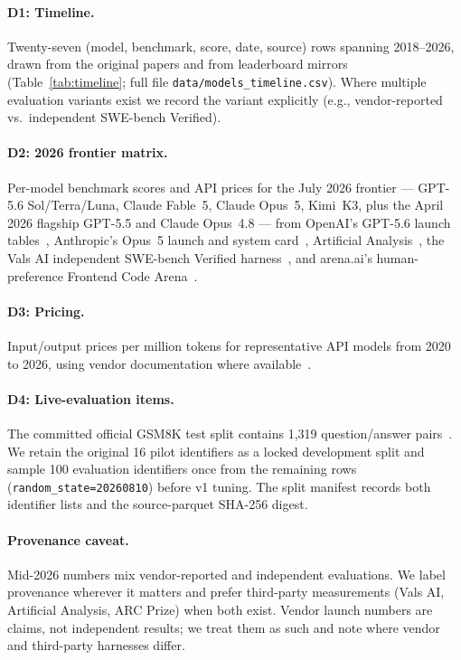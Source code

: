 \documentclass[11pt]{article}
\begin{document}
\paragraph{D1: Timeline.} Twenty-seven (model, benchmark, score, date, source)
rows spanning 2018--2026, drawn from the original papers and from leaderboard
mirrors (Table~\ref{tab:timeline}; full file \texttt{data/models\_timeline.csv}).
Where multiple evaluation variants exist we record the variant explicitly
(e.g., vendor-reported vs.\ independent SWE-bench Verified).

\paragraph{D2: 2026 frontier matrix.} Per-model benchmark scores and API prices
for the July 2026 frontier --- GPT-5.6 Sol/Terra/Luna, Claude Fable~5, Claude
Opus~5, Kimi~K3, plus the April 2026 flagship GPT-5.5 and Claude Opus~4.8 ---
from OpenAI's GPT-5.6 launch tables~\cite{openai2026gpt56}, Anthropic's Opus~5
launch and system card~\cite{anthropic2026opus5,anthropic2026opus5card},
Artificial Analysis~\cite{aa2026gpt56,gist2026aa56}, the Vals AI independent
SWE-bench Verified harness~\cite{vals2026swebench}, and arena.ai's
human-preference Frontend Code Arena~\cite{arena2026webdev}.

\paragraph{D3: Pricing.} Input/output prices per million tokens for
representative API models from 2020 to 2026, using vendor documentation where
available~\cite{deploybase2026prices,openai2026gpt56}.

\paragraph{D4: Live-evaluation items.} The committed official GSM8K test split
contains 1,319 question/answer pairs~\cite{cobbe2021gsm8k}. We retain the
original 16 pilot identifiers as a locked development split and sample 100
evaluation identifiers once from the remaining rows
(\texttt{random\_state=20260810}) before v1 tuning. The split manifest records
both identifier lists and the source-parquet SHA-256 digest.

\paragraph{Provenance caveat.} Mid-2026 numbers mix vendor-reported and
independent evaluations. We label provenance wherever it matters and prefer
third-party measurements (Vals AI, Artificial Analysis, ARC Prize) when both
exist. Vendor launch numbers are claims, not independent results; we treat them
as such and note where vendor and third-party harnesses differ.
\end{document}
